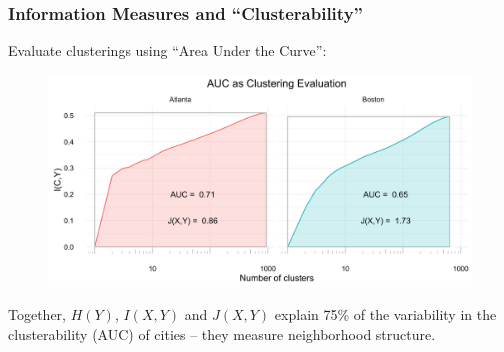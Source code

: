 \documentclass{beamer}
\begin{document}
	\begin{frame}[t]\frametitle{Information Measures and ``Clusterability''}
	    Evaluate clusterings using ``Area Under the Curve'':
	    \begin{figure}
	    	\centering
	    	\includegraphics[width=.8\textwidth]{figs/AUC_illustration.png}
	    \end{figure}
	    Together, $H(Y)$, $I(X,Y)$ and $J(X,Y)$ explain 75\% of the variability in the clusterability (AUC) of cities -- they measure neighborhood structure.  
	\end{frame}
	\fi
\end{document}
